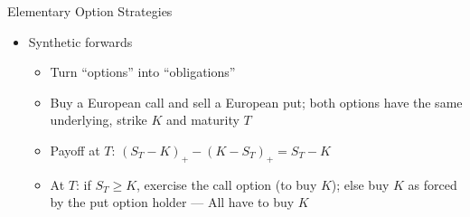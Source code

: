 \documentclass[10pt,handout]{beamer}
\theoremstyle{definition}
\begin{document}
\begin{frame}{Elementary Option Strategies}
\begin{itemize}
    \item Synthetic forwards
      \begin{itemize}
        \item Turn ``options'' into ``obligations''  
        \item Buy a European call and sell a European put; both options have the same underlying, strike $K$ and maturity $T$ 
        \item Payoff at $T$: $(S_T - K)_+ - (K - S_T)_+ = S_T - K$ 
        \item At $T$: if $S_T \geqslant K$, exercise the call option (to buy $K$); else buy $K$ as forced by the put option holder --- All have to buy $K$   
      \end{itemize}
  \end{itemize}
\end{frame}
\end{document}
